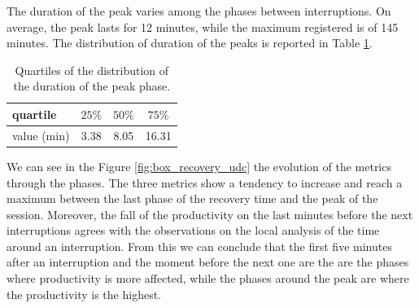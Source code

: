 \documentclass[times]{smrauth}
\begin{document}
The duration of the peak varies among the phases between interruptions. On average, the peak lasts for 12 minutes, while the maximum registered is of 145 minutes. The distribution of duration of the peaks is reported in Table \ref{tbl:dist_peaks}.

\begin{table}[ht!]
	\small
	\renewcommand{\arraystretch}{1.3}
	\caption{Quartiles of the distribution of the duration of the peak phase.}
	\label{tbl:dist_peaks}
	\centering
	\begin{tabular}{l |c | c |c} 
		quartile & $25\%$ & $50\%$ & $75\%$ \\  
		\hline 
		 value (min) & 3.38 & 8.05  & 16.31   \\   
	\end{tabular}
\end{table}


We can see in the Figure \ref{fig:box_recovery_udc} the evolution of the metrics through
the phases. The three metrics show a tendency to increase and reach a maximum between the last phase of the recovery time and the peak of the session. Moreover, the fall of the productivity on the last minutes before the next interruptions agrees with the observations on the local analysis of the time around an interruption. From this we can conclude that the first five minutes after an interruption and the moment before the next one are the are the phases where productivity is more affected, while the phases around the peak are where the productivity is the highest.
\end{document}

